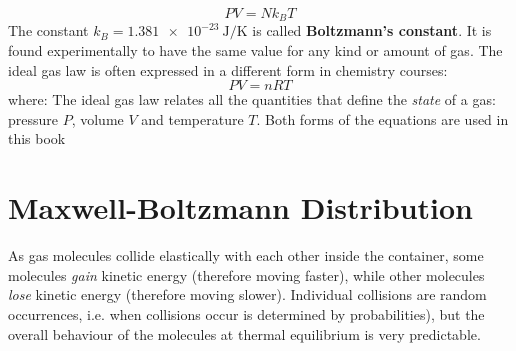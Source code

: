 \begin{equation}
  \boxed{PV=Nk_BT}
\end{equation}
The constant $k_B=\SI{1.381e-23}{\joule\per\kelvin}$ is called
\textbf{Boltzmann's constant}. It is found experimentally to have the same
value for any kind or amount of gas.
%
%
%
%
The ideal gas law is often expressed in a different form in chemistry courses:  
\begin{equation}
  \boxed{PV=nRT}
\end{equation}
where:
The ideal gas law relates all the quantities that define the \emph{state} of a
gas: pressure $P$, volume $V$ and temperature $T$. Both forms of the equations
are used in this book



\section{Maxwell-Boltzmann Distribution}

As gas molecules collide elastically with each other inside the container,
some molecules \emph{gain} kinetic energy (therefore moving faster), while
other molecules \emph{lose} kinetic energy (therefore moving slower).
Individual collisions are random occurrences, i.e. when collisions occur is
determined by probabilities), but the overall behaviour of the molecules at
thermal equilibrium is very predictable.

